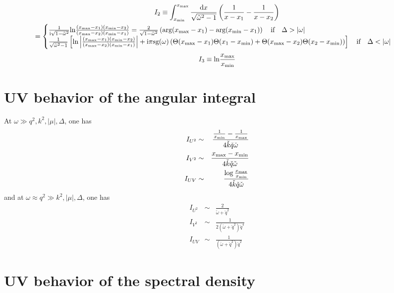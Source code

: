 \documentclass[10pt,a4paper,a4wide]{article}
\newcommand{\be}{\begin{equation}}
\newcommand{\ee}{\end{equation}}
\newcommand{\bea}{\begin{eqnarray}}
\newcommand{\eea}{\end{eqnarray}}
\newcommand{\ii}{\mathrm{i}}
\newcommand{\dd}{\mathrm{d}}
\newcommand{\bb}[1]{\left( #1 \right)}
\newcommand{\bbcro}[1]{\left[ #1 \right]}
\begin{document}
\begin{multline}
I_2\equiv \int_{x_{\rm min}}^{x_{\rm max}} \frac{\dd x}{\sqrt{\check\omega^2-1}} \bb{\frac{1}{x-x_1}-\frac{1}{x-x_2}} \\ 
=\begin{cases} \frac{1}{\ii\sqrt{1-\check\omega^2}} \text{ln} {\frac{(x_{\rm max}-x_1)(x_{\rm min}-x_2)}{(x_{\rm max}-x_2)(x_{\rm min}-x_1)}}= \frac{2}{\sqrt{1-\check\omega^2}}\bb{\text{arg}(x_{\rm max}-x_1)-\text{arg}(x_{\rm min}-x_1)} \quad  \text{if} \quad \Delta>|\omega| \\
 \frac{1}{\sqrt{\check\omega^2-1}} \bbcro{\text{ln} \left\vert{\frac{(x_{\rm max}-x_1)(x_{\rm min}-x_2)}{(x_{\rm max}-x_2)(x_{\rm min}-x_1)}}\right\vert +\ii\pi \text{sg}(\omega) \bb{\Theta(x_{\rm max}-x_1)\Theta(x_1-x_{\rm min})+\Theta(x_{\rm max}-x_2)\Theta(x_2-x_{\rm min})}}\quad  \text{if} \quad  \Delta<|\omega|
\end{cases}
\end{multline}
\be
I_3\equiv\text{ln}\frac{x_{\rm max}}{x_{\rm min}}
\ee

\section{UV behavior of the angular integral}

At $\omega\gg q^2,k^2,|\mu|,\Delta$, one has
\bea
I_{U^2}&\sim& \frac{{\frac{1}{x_{\rm min}}-\frac{1}{x_{\rm max}}}}{4\check k \check q \check \omega}\\
I_{V^2}&\sim& \frac{{x_{\rm max}-x_{\rm min}}}{4\check k \check q \check \omega} \\
I_{UV}&\sim& \frac{\log\frac{x_{\rm max}}{x_{\rm min}}}{4\check k \check q \check \omega} 
\eea
and at $\omega\approx q^2\gg k^2,|\mu|,\Delta$, one has
\bea
I_{U^2}&\sim& \frac{2}{\check \omega+\check q^2}\\
I_{V^2}&\sim& \frac{1}{2(\check \omega+\check q^2)\check q^4} \\
I_{UV}&\sim& \frac{1}{(\check \omega+\check q^2)\check q^2} 
\eea
\section{UV behavior of the spectral density}
\end{document}
